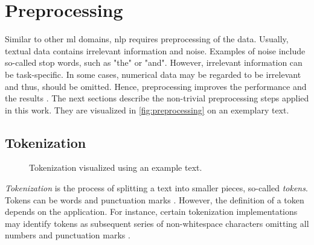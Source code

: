 \section{Preprocessing}\label{sec:preprocessing}

Similar to other \ac{ml} domains, \ac{nlp} requires preprocessing of the data.
Usually, textual data contains irrelevant information and noise.
Examples of noise include so-called stop words, such as "the" or "and".
However, irrelevant information can be task-specific. 
In some cases, numerical data may be regarded to be irrelevant and thus, should be omitted.
Hence, preprocessing improves the performance and the results \cite{clusteringDocs2020}.
The next sections describe the non-trivial preprocessing steps applied in this work.
They are visualized in \autoref{fig:preprocessing} on an exemplary text.



\subsection{Tokenization}\label{subsec:tokenization}

\begin{figure}[!htb] %
    \centering
    
    \caption[Tokenization]{Tokenization visualized using an example text.}
    \label{fig:preproc-tokenization}
\end{figure}

\textit{Tokenization} is the process of splitting a text into smaller pieces, so-called \textit{tokens}.
Tokens can be words and punctuation marks \cite{nlp-book2009}.
However, the definition of a token depends on the application.
For instance, certain tokenization implementations may identify tokens as subsequent series of non-whitespace characters omitting all numbers and punctuation marks \cite{IR2011}.




\subsection{\stopWordRemoval{}}\label{subsec:stop-word-removal}

